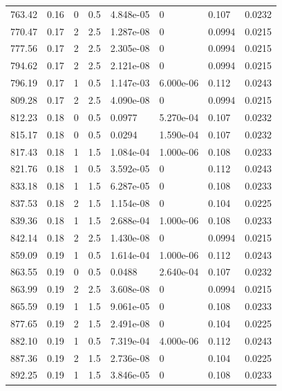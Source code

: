 \documentclass[preview]{standalone}
\begin{document}
{{{\begin{tabular}{L{1.2cm}C{1.2cm} C{0.3cm}C{0.5cm} C{1.4cm}C{1.4cm} C{1.4cm}C{1.4cm}}
  763.42  &  0.16  & 0     & 0.5 &  4.848e-05  & 0  & 0.107 &  0.0232   \\ 
  770.47  &  0.17  & 2     & 2.5 &  1.287e-08  & 0  & 0.0994 &  0.0215   \\ 
  777.56  &  0.17  & 2     & 2.5 &  2.305e-08  & 0  & 0.0994 &  0.0215   \\ 
  794.62  &  0.17  & 2     & 2.5 &  2.121e-08  & 0  & 0.0994 &  0.0215   \\ 
  796.19  &  0.17  & 1     & 0.5 &  1.147e-03  & 6.000e-06  & 0.112 &  0.0243   \\ 
  809.28  &  0.17  & 2     & 2.5 &  4.090e-08  & 0  & 0.0994 &  0.0215   \\ 
  812.23  &  0.18  & 0     & 0.5 &  0.0977  & 5.270e-04  & 0.107 &  0.0232   \\ 
  815.17  &  0.18  & 0     & 0.5 &  0.0294  & 1.590e-04  & 0.107 &  0.0232   \\ 
  817.43  &  0.18  & 1     & 1.5 &  1.084e-04  & 1.000e-06  & 0.108 &  0.0233   \\ 
  821.76  &  0.18  & 1     & 0.5 &  3.592e-05  & 0  & 0.112 &  0.0243   \\ 
  833.18  &  0.18  & 1     & 1.5 &  6.287e-05  & 0  & 0.108 &  0.0233   \\ 
  837.53  &  0.18  & 2     & 1.5 &  1.154e-08  & 0  & 0.104 &  0.0225   \\ 
  839.36  &  0.18  & 1     & 1.5 &  2.688e-04  & 1.000e-06  & 0.108 &  0.0233   \\ 
  842.14  &  0.18  & 2     & 2.5 &  1.430e-08  & 0  & 0.0994 &  0.0215   \\ 
  859.09  &  0.19  & 1     & 0.5 &  1.614e-04  & 1.000e-06  & 0.112 &  0.0243   \\ 
  863.55  &  0.19  & 0     & 0.5 &  0.0488  & 2.640e-04  & 0.107 &  0.0232   \\ 
  863.99  &  0.19  & 2     & 2.5 &  3.608e-08  & 0  & 0.0994 &  0.0215   \\ 
  865.59  &  0.19  & 1     & 1.5 &  9.061e-05  & 0  & 0.108 &  0.0233   \\ 
  877.65  &  0.19  & 2     & 1.5 &  2.491e-08  & 0  & 0.104 &  0.0225   \\ 
  882.10  &  0.19  & 1     & 0.5 &  7.319e-04  & 4.000e-06  & 0.112 &  0.0243   \\ 
  887.36  &  0.19  & 2     & 1.5 &  2.736e-08  & 0  & 0.104 &  0.0225   \\ 
  892.25  &  0.19  & 1     & 1.5 &  3.846e-05  & 0  & 0.108 &  0.0233   \\ 

\end{tabular}}}}
\end{document}
